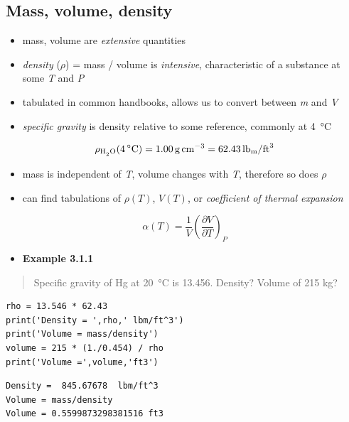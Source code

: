\documentclass[11pt]{article}
\begin{document}
\subsection{Mass, volume, density}
\label{sec-4-2}
\begin{itemize}
\item mass, volume are \emph{extensive} quantities
\item \emph{density} ($\rho$) = mass / volume is \emph{intensive}, characteristic of a substance at some \emph{T} and \emph{P}
\item tabulated in common handbooks, allows us to convert between \emph{m} and \emph{V}
\item \emph{specific gravity} is density relative to some reference, commonly  at \SI{4}{\celsius}
\end{itemize}
\begin{equation}
 \rho_{\ce{H2O}}(\SI{4}{\celsius}) = \SI{1.00}{\gram\per\cm\cubed} = \SI{62.43}{lb_{m}\per ft\cubed}
\end{equation}
\begin{itemize}
\item mass is independent of \emph{T}, volume changes with \emph{T}, therefore so does $\rho$
\item can find tabulations of \(\rho(T)\), \(V(T)\), or \emph{coefficient of thermal expansion}
\end{itemize}
\begin{equation}
\alpha(T) = \frac{1}{V}\left ( \frac{\partial V}{\partial T} \right )_{P}
\end{equation}
\begin{itemize}
\item \textbf{Example 3.1.1}
\end{itemize}

\begin{quote}
Specific gravity of Hg at \SI{20}{\celsius} is 13.456.  Density?  Volume of 215 kg?
\end{quote}

\begin{verbatim}
rho = 13.546 * 62.43
print('Density = ',rho,' lbm/ft^3')
print('Volume = mass/density')
volume = 215 * (1./0.454) / rho
print('Volume =',volume,'ft3')
\end{verbatim}

\begin{verbatim}
Density =  845.67678  lbm/ft^3
Volume = mass/density
Volume = 0.5599873298381516 ft3
\end{verbatim}
\end{document}
